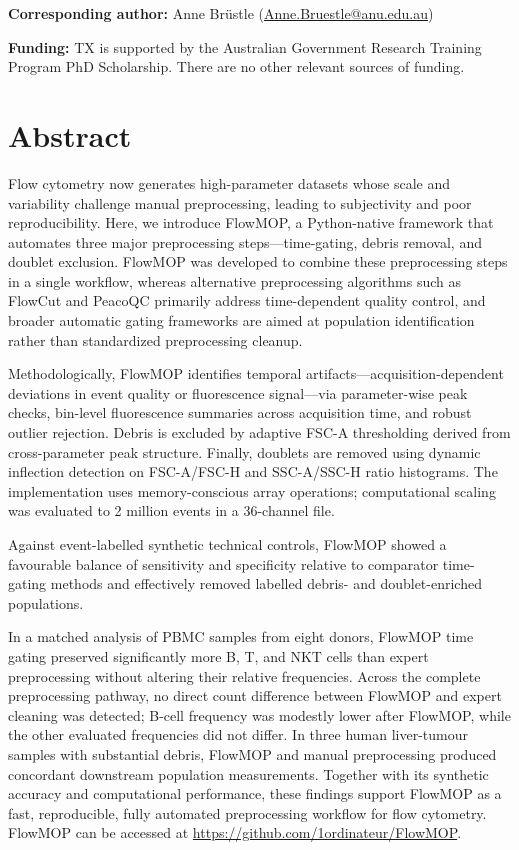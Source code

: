 \documentclass[ASNA]{latex/wiley/USG}
\begin{document}
\noindent\textbf{Corresponding author:} Anne Brüstle (\href{mailto:Anne.Bruestle@anu.edu.au}{Anne.Bruestle@anu.edu.au})

\par\noindent\textbf{Funding:} TX is supported by the Australian
Government Research Training Program PhD Scholarship. There are no other
relevant sources of funding.

\section*{Abstract}
Flow cytometry now generates high-parameter datasets whose scale and
variability challenge manual preprocessing, leading to subjectivity and
poor reproducibility. Here, we introduce FlowMOP, a Python-native
framework that automates three major preprocessing steps---time-gating,
debris removal, and doublet exclusion. FlowMOP was developed to combine
these preprocessing steps in a single workflow, whereas alternative
preprocessing algorithms such as FlowCut and PeacoQC primarily address
time-dependent quality control, and broader automatic gating frameworks
are aimed at population identification rather than standardized
preprocessing cleanup.

Methodologically, FlowMOP identifies temporal
artifacts---acquisition-dependent deviations in event quality or
fluorescence signal---via parameter-wise peak checks, bin-level
fluorescence summaries across acquisition time, and robust outlier
rejection. Debris is excluded by adaptive FSC-A thresholding derived
from cross-parameter peak structure. Finally, doublets are removed using
dynamic inflection detection on FSC-A/FSC-H and SSC-A/SSC-H ratio
histograms. The implementation uses memory-conscious array operations;
computational scaling was evaluated to 2 million events in a 36-channel
file.

Against event-labelled synthetic technical controls, FlowMOP showed a
favourable balance of sensitivity and specificity relative to comparator
time-gating methods and effectively removed labelled debris- and
doublet-enriched populations.

In a matched analysis of PBMC samples from eight donors, FlowMOP time
gating preserved significantly more B, T, and NKT cells than expert
preprocessing without altering their relative frequencies. Across the
complete preprocessing pathway, no direct count difference between
FlowMOP and expert cleaning was detected; B-cell frequency was modestly
lower after FlowMOP, while the other evaluated frequencies did not
differ. In three human liver-tumour samples with substantial debris,
FlowMOP and manual preprocessing produced concordant downstream
population measurements. Together with its synthetic accuracy and
computational performance, these findings support FlowMOP as a fast,
reproducible, fully automated preprocessing workflow for flow cytometry.
FlowMOP can be accessed at \url{https://github.com/1ordinateur/FlowMOP}.
\end{document}
